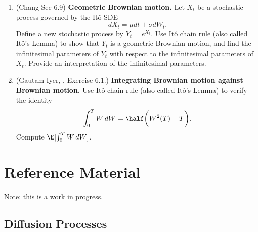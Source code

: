 \documentclass{article} %
\begin{document}
\begin{enumerate}
\item (Chang Sec 6.9) \textbf{Geometric Brownian motion.} Let $X_t$ be a stochastic process governed by the It\^{o} SDE 
	\[dX_t = \mu dt + \sigma dW_t.\]  
	Define a new stochastic process by $Y_t = e^{X_t}.$ Use It\^{o} chain rule (also called It\^{o}'s Lemma) to show that $Y_t$ is a geometric Brownian motion, and find the infinitesimal parameters of $Y_t$ with respect to the infinitesimal parameters of $X_t$. Provide an interpretation of the infinitesimal parameters.
\item (Gautam Iyer, \textit{\href{https://www.math.cmu.edu/~gautam/sj/teaching/2021-22/944-scalc-finance1/pdfs/ch3-int.pdf}{\underline{}}}, Exercise 6.1.) \textbf{Integrating Brownian motion against Brownian motion.} Use It\^{o} chain rule (also called It\^{o}'s Lemma) to verify the identity
	\[ \int_0^T W \, dW = \half \bigg( W^2(T) - T \bigg). \]
Compute $\E[\int_0^T W \, dW]$.
\end{enumerate}

\appendix

\section{Reference Material}

Note: this is a work in progress.

%

\subsection{Diffusion Processes}
\end{document}
